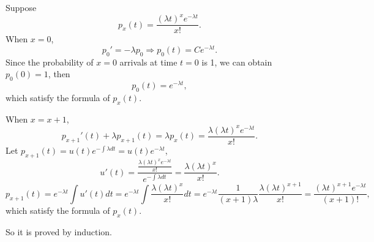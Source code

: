 \documentclass[11pt,a4paper]{article}
\begin{document}
Suppose $$p_x(t)=\frac{(\lambda t)^xe^{-\lambda t}}{x!}.$$
When $x=0$,
$$p_0'=-\lambda p_0\Longrightarrow p_0(t)=Ce^{-\lambda t}.$$
Since the probability of $x=0$ arrivals at time $t=0$ is 1, we can obtain $p_0(0)=1$, then
$$p_0(t)=e^{-\lambda t},$$
which satisfy the formula of $p_x(t)$.

When $x=x+1$,
$$p_{x+1}'(t)+\lambda p_{x+1}(t)=\lambda p_x(t)=\frac{\lambda(\lambda t)^xe^{-\lambda t}}{x!}.$$
Let $p_{x+1}(t)=u(t)e^{-\int\lambda dt}=u(t)e^{-\lambda t}$,
$$u'(t)=\frac{\frac{\lambda(\lambda t)^xe^{-\lambda t}}{x!}}{e^{-\int\lambda dt}}=\frac{\lambda(\lambda t)^x}{x!}.$$
$$p_{x+1}(t)=e^{-\lambda t}\int u'(t)dt=e^{-\lambda t}\int\frac{\lambda(\lambda t)^x}{x!}dt=e^{-\lambda t}\frac{1}{(x+1)\lambda}\frac{\lambda(\lambda t)^{x+1}}{x!}=\frac{(\lambda t)^{x+1}e^{-\lambda t}}{(x+1)!},$$
which satisfy the formula of $p_x(t)$.

So it is proved by induction.
\end{document}
